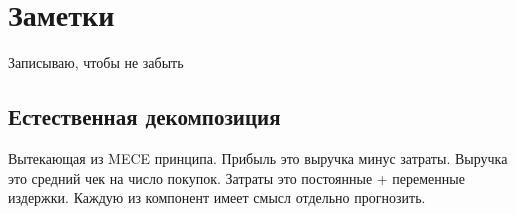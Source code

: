 \chapter{Заметки}
Записываю, чтобы не забыть

\section{Естественная декомпозиция}

Вытекающая из MECE принципа. Прибыль это выручка минус затраты. Выручка это средний чек на число покупок. Затраты это постоянные + переменные издержки.
Каждую из компонент имеет смысл отдельно прогнозить.
